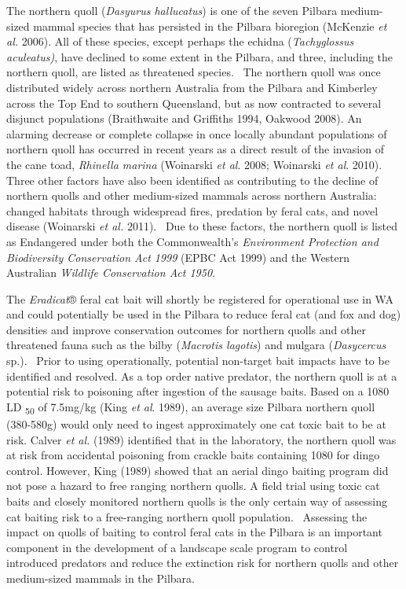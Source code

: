 \documentclass[version=last,
    paper=a4,                               %
    10pt,                                   %
    dvipsnames,
    oneside,                              %
    headings=openany,                       %
    open=any,
    BCOR=7mm,                               %
    DIV=15,     %
]{scrbook}
\begin{document}
The northern quoll (\emph{Dasyurus hallucatus}) is one of the seven
Pilbara medium-sized mammal species that has persisted in the Pilbara
bioregion (McKenzie \emph{et al.} 2006). All of these species, except
perhaps the echidna (\emph{Tachyglossus aculeatus)}, have declined to
some extent in the Pilbara, and three, including the northern quoll, are
listed as threatened species. ~The northern quoll was once distributed
widely across northern Australia from the Pilbara and Kimberley across
the Top End to southern Queensland, but as now contracted to several
disjunct populations (Braithwaite and Griffiths 1994, Oakwood 2008). An
alarming decrease or complete collapse in once locally abundant
populations of northern quoll has occurred in recent years as a direct
result of the invasion of the cane toad, \emph{Rhinella marina}
(Woinarski \emph{et al}. 2008; Woinarski \emph{et al}. 2010). Three
other factors have also been identified as contributing to the decline
of northern quolls and other medium-sized mammals across northern
Australia: changed habitats through widespread fires, predation by feral
cats, and novel disease (Woinarski \emph{et al.} 2011). ~Due to these
factors, the northern quoll is listed as Endangered under both the
Commonwealth's \emph{Environment Protection and Biodiversity
Conservation Act 1999} (EPBC Act 1999) and the Western Australian
\emph{Wildlife Conservation Act 1950.}

The \emph{Eradicat}® feral cat bait will shortly be registered for
operational use in WA and could potentially be used in the Pilbara to
reduce feral cat (and fox and dog) densities and improve conservation
outcomes for northern quolls and other threatened fauna such as the
bilby (\emph{Macrotis lagotis}) and mulgara (\emph{Dasycercus} sp.).
~Prior to using operationally, potential non-target bait impacts have to
be identified and resolved. As a top order native predator, the northern
quoll is at a potential risk to poisoning after ingestion of the sausage
baits. Based on a 1080 LD \textsubscript{50} of 7.5mg/kg (King \emph{et
al}. 1989), an average size Pilbara northern quoll (380-580g) would only
need to ingest approximately one cat toxic bait to be at risk. Calver
\emph{et al.} (1989) identified that in the laboratory, the northern
quoll was at risk from accidental poisoning from crackle baits
containing 1080 for dingo control. However, King (1989) showed that an
aerial dingo baiting program did not pose a hazard to free ranging
northern quolls. A field trial using toxic cat baits and closely
monitored northern quolls is the only certain way of assessing cat
baiting risk to a free-ranging northern quoll population.~ Assessing the
impact on quolls of baiting to control feral cats in the Pilbara is an
important component in the development of a landscape scale program to
control introduced predators and reduce the extinction risk for northern
quolls and other medium-sized mammals in the Pilbara.
\end{document}
